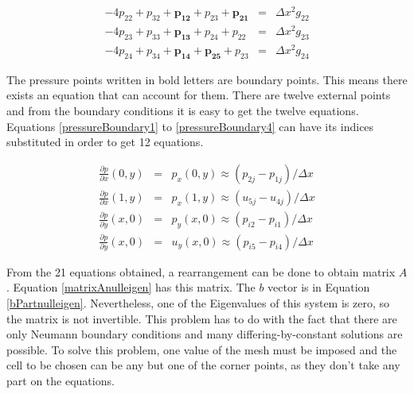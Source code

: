 \documentclass[journal]{IEEEtran}
\begin{document}
\begin{eqnarray}
-4p_{22} + p_{32} + \boldsymbol{p_{12}} + p_{23} + \boldsymbol{p_{21}} &=& \Delta x^2 g_{22} \label{internalPoissonEq1}\\
-4p_{23} + p_{33} + \boldsymbol{p_{13}} + p_{24} + p_{22} &=& \Delta x^2 g_{23}\label{internalPoissonEq2}\\
-4p_{24} + p_{34} + \boldsymbol{p_{14}} + \boldsymbol{p_{25}} + p_{23} &=& \Delta x^2 g_{24}\label{internalPoissonEq3}
\end{eqnarray}

The pressure points written in bold letters are boundary points. This means there exists an equation that can account for them. There are twelve external points and from the boundary conditions it is easy to get the twelve equations. Equations \ref{pressureBoundary1} to \ref{pressureBoundary4} can have its indices substituted in order to get 12 equations.

\begin{eqnarray}
\frac{\partial p}{\partial x}\left(0, y\right) &=& p_x\left(0, y\right)  \approx  (p_{2j} - p_{1j})/\Delta x \label{pressureBoundary1}\\
\frac{\partial p}{\partial x}\left(1, y\right) &=& p_x\left(1, y\right)  \approx  (u_{5j} - u_{4j})/\Delta x\\
\frac{\partial p}{\partial y}\left(x, 0\right) &=& p_y\left(x, 0\right)  \approx (p_{i2} - p_{i1})/\Delta x\\
\frac{\partial p}{\partial y}\left(x, 0\right) &=& u_y\left(x, 0\right)  \approx  (p_{i5} - p_{i4})/\Delta x\label{pressureBoundary4}
\end{eqnarray}

From the 21 equations obtained, a rearrangement can be done to obtain matrix $A$. Equation \ref{matrixAnulleigen} has this matrix. The $b$ vector is in Equation \ref{bPartnulleigen}. Nevertheless, one of the Eigenvalues of this system is zero, so the matrix is not invertible. This problem has to do with the fact that there are only Neumann boundary conditions and many differing-by-constant solutions are possible. To solve this problem, one value of the mesh must be imposed and the cell to be chosen can be any but one of the corner points, as they don't take any part on the equations. 
\end{document}
